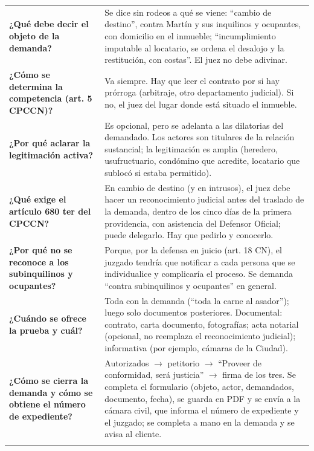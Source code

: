 \documentclass[12pt,oneside]{book}
\begin{document}
\begin{longtable}{>{\RaggedRight\arraybackslash}p{} >{\RaggedRight\arraybackslash}p{}}
\textbf{¿Qué debe decir el objeto de la demanda?} &
Se dice sin rodeos a qué se viene: ``cambio de destino'', contra Martín y sus inquilinos y ocupantes, con domicilio en el inmueble; ``incumplimiento imputable al locatario, se ordena el desalojo y la restitución, con costas''. El juez no debe adivinar. \\
\addlinespace \cmidrule{1-2}

\textbf{¿Cómo se determina la competencia (art. 5 CPCCN)?} &
Va siempre. Hay que leer el contrato por si hay prórroga (arbitraje, otro departamento judicial). Si no, el juez del lugar donde está situado el inmueble. \\
\addlinespace \cmidrule{1-2}

\textbf{¿Por qué aclarar la legitimación activa?} &
Es opcional, pero se adelanta a las dilatorias del demandado. Los actores son titulares de la relación sustancial; la legitimación es amplia (heredero, usufructuario, condómino que acredite, locatario que sublocó si estaba permitido). \\
\addlinespace \cmidrule{1-2}

\textbf{¿Qué exige el artículo 680 ter del CPCCN?} &
En cambio de destino (y en intrusos), el juez debe hacer un reconocimiento judicial antes del traslado de la demanda, dentro de los cinco días de la primera providencia, con asistencia del Defensor Oficial; puede delegarlo. Hay que pedirlo y conocerlo. \\
\addlinespace \cmidrule{1-2}

\textbf{¿Por qué no se reconoce a los subinquilinos y ocupantes?} &
Porque, por la defensa en juicio (art. 18 CN), el juzgado tendría que notificar a cada persona que se individualice y complicaría el proceso. Se demanda ``contra subinquilinos y ocupantes'' en general. \\
\addlinespace \cmidrule{1-2}

\textbf{¿Cuándo se ofrece la prueba y cuál?} &
Toda con la demanda (``toda la carne al asador''); luego solo documentos posteriores. Documental: contrato, carta documento, fotografías; acta notarial (opcional, no reemplaza el reconocimiento judicial); informativa (por ejemplo, cámaras de la Ciudad). \\
\addlinespace \cmidrule{1-2}

\textbf{¿Cómo se cierra la demanda y cómo se obtiene el número de expediente?} &
Autorizados $\rightarrow$ petitorio $\rightarrow$ ``Proveer de conformidad, será justicia'' $\rightarrow$ firma de los tres. Se completa el formulario (objeto, actor, demandados, documento, fecha), se guarda en PDF y se envía a la cámara civil, que informa el número de expediente y el juzgado; se completa a mano en la demanda y se avisa al cliente. \\
\addlinespace


\end{longtable}
\end{document}
